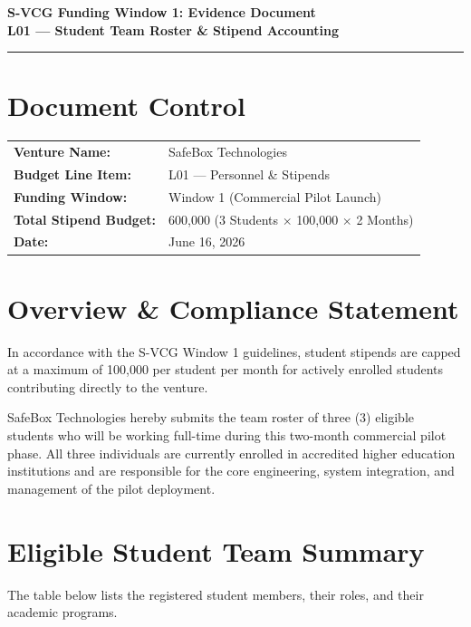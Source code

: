 \documentclass[11pt,a4paper]{article}
\begin{document}
\begin{center}
    {\LARGE \textbf{S-VCG Funding Window 1: Evidence Document}} \\
    \vspace{0.2cm}
    {\large \textbf{L01 --- Student Team Roster \& Stipend Accounting}} \\
    \vspace{0.1cm}
    \rule{\linewidth}{1pt}
\end{center}

\vspace{0.2cm}

\section*{Document Control}
\begin{tabular}{ll}
    \textbf{Venture Name:} & SafeBox Technologies \\
    \textbf{Budget Line Item:} & L01 --- Personnel \& Stipends \\
    \textbf{Funding Window:} & Window 1 (Commercial Pilot Launch) \\
    \textbf{Total Stipend Budget:} & \text{₦}600,000 (3 Students $\times$ \text{₦}100,000 $\times$ 2 Months) \\
    \textbf{Date:} & June 16, 2026 \\
\end{tabular}

\vspace{0.5cm}

\section{Overview \& Compliance Statement}
In accordance with the S-VCG Window 1 guidelines, student stipends are capped at a maximum of 100,000 per student per month for actively enrolled students contributing directly to the venture. 

SafeBox Technologies hereby submits the team roster of three (3) eligible students who will be working full-time during this two-month commercial pilot phase. All three individuals are currently enrolled in accredited higher education institutions and are responsible for the core engineering, system integration, and management of the pilot deployment.

\vspace{0.3cm}

\section{Eligible Student Team Summary}
The table below lists the registered student members, their roles, and their academic programs.
\end{document}
